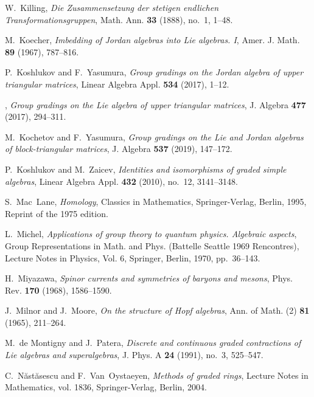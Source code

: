 \documentclass[12pt]{pdfathesis}
\begin{document}
\begin{thebibliography}{BHDSK17}
W.~Killing, \emph{Die {Z}usammensetzung der stetigen endlichen
  {T}ransformationsgruppen}, Math. Ann. \textbf{33} (1888), no.~1, 1--48.

M.~Koecher, \emph{Imbedding of {J}ordan algebras into {L}ie algebras. {I}},
  Amer. J. Math. \textbf{89} (1967), 787--816. 

P.~Koshlukov and F.~Yasumura, \emph{Group gradings on the {J}ordan algebra of
  upper triangular matrices}, Linear Algebra Appl. \textbf{534} (2017), 1--12.

\bysame, \emph{Group gradings on the {L}ie algebra of upper triangular
  matrices}, J. Algebra \textbf{477} (2017), 294--311. 

M.~Kochetov and F.~Yasumura, \emph{Group gradings on the {L}ie and {J}ordan
  algebras of block-triangular matrices}, J. Algebra \textbf{537} (2019),
  147--172. 

P.~Koshlukov and M.~Zaicev, \emph{Identities and isomorphisms of graded simple
  algebras}, Linear Algebra Appl. \textbf{432} (2010), no.~12, 3141--3148.

S.~Mac~Lane, \emph{Homology}, Classics in Mathematics, Springer-Verlag, Berlin,
  1995, Reprint of the 1975 edition. 

L.~Michel, \emph{Applications of group theory to quantum physics. {A}lgebraic
  aspects}, Group {R}epresentations in {M}ath. and {P}hys. ({B}attelle
  {S}eattle 1969 {R}encontres), Lecture Notes in Physics, Vol. 6, Springer,
  Berlin, 1970, pp.~36--143. 

H.~Miyazawa, \emph{Spinor currents and symmetries of baryons and mesons}, Phys.
  Rev. \textbf{170} (1968), 1586--1590.

J.~Milnor and J.~Moore, \emph{On the structure of {H}opf algebras}, Ann. of
  Math. (2) \textbf{81} (1965), 211--264. 

M.~de Montigny and J.~Patera, \emph{Discrete and continuous graded contractions
  of {L}ie algebras and superalgebras}, J. Phys. A \textbf{24} (1991), no.~3,
  525--547. 

C.~N\u{a}st\u{a}sescu and F.~Van~Oystaeyen, \emph{Methods of graded rings},
  Lecture Notes in Mathematics, vol. 1836, Springer-Verlag, Berlin, 2004.


\end{thebibliography}
\end{document}
